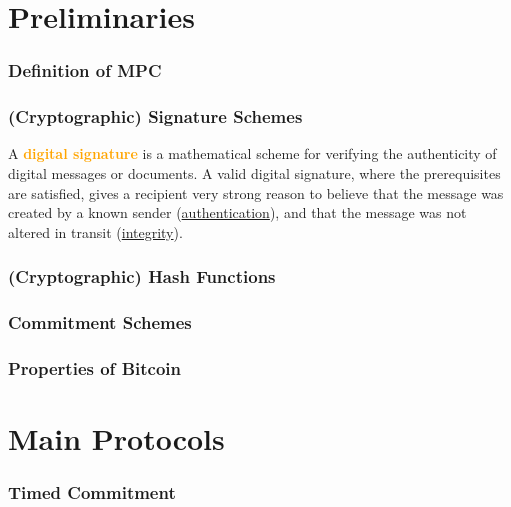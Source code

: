 \documentclass{beamer}
\begin{document}

\section{Preliminaries}

\begin{frame}\frametitle{Definition of MPC} 

\end{frame}

\begin{frame}\frametitle{(Cryptographic) Signature Schemes} 

A \textcolor{orange}{\textbf{digital signature}} is a mathematical scheme for verifying the authenticity of digital messages or documents. A valid digital signature, where the prerequisites are satisfied, gives a recipient very strong reason to believe that the message was created by a known sender (\underline{authentication}), and that the message was not altered in transit (\underline{integrity}).

\end{frame}

\begin{frame}\frametitle{(Cryptographic) Hash Functions} 

\end{frame}

\begin{frame}\frametitle{Commitment Schemes} 

\end{frame}

\begin{frame}\frametitle{Properties of Bitcoin} 

\end{frame}



\section{Main Protocols}

\begin{frame}\frametitle{Timed Commitment} 

\end{frame}
\end{document}
